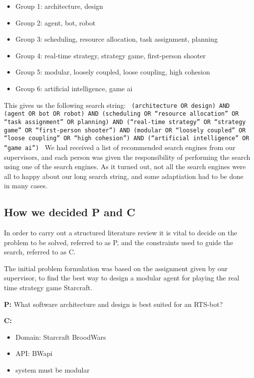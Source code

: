 \begin{itemize}

\item Group 1: architecture, design
\item Group 2: agent, bot, robot
\item Group 3: scheduling, resource allocation, task assignment, planning
\item Group 4: real-time strategy, strategy game, first-person shooter
\item Group 5: modular, loosely coupled, loose coupling, high cohesion
\item Group 6: artificial intelligence, game ai

\end{itemize}
This gives us the following search  string:
\texttt{%
(architecture OR design)
AND (agent OR bot OR robot)
AND (scheduling OR ``resource allocation'' OR ``task assignment'' OR planning)
AND (``real-time strategy'' OR ``strategy game'' OR ``first-person shooter'')
AND (modular OR ``loosely coupled'' OR ``loose coupling'' OR ``high cohesion'')
AND (``artificial intelligence'' OR ``game ai'')
}
We had received a list of recommended search engines from our supervisors, and each person was given the responsibility of performing the search using one of the search engines. As it turned out, not all the search engines were all to happy about our long search string, and some adaptiation had to be done in many cases.

\subsection{How we decided P and C}
\label{sub:how_we_decided_p_and_c}
In order to carry out a structured literature review it is vital to decide on the problem to be solved, referred to as P, and the constraints used to guide the search, referred to as C.

The initial problem formulation was based on the assignment given by our supervisor, to find the best way to design a modular agent for playing the real time strategy game Starcraft.  

\textbf{P:} What software architecture and design is best suited for an RTS-bot?

\textbf{C:}
\begin{itemize}
\item Domain: Starcraft BroodWars
\item API: BWapi
\item system must be modular	
\end{itemize}

